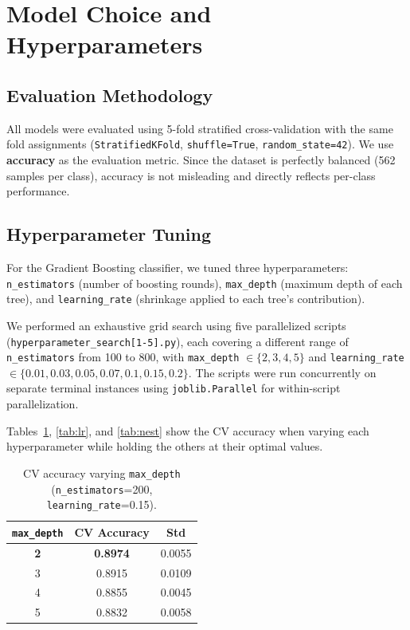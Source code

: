 \documentclass[12pt]{article}
\begin{document}
\section{Model Choice and Hyperparameters}

\subsection*{Evaluation Methodology}

All models were evaluated using 5-fold stratified cross-validation with the same fold assignments (\texttt{StratifiedKFold}, \texttt{shuffle=True}, \texttt{random\_state=42}). We use \textbf{accuracy} as the evaluation metric. Since the dataset is perfectly balanced (562 samples per class), accuracy is not misleading and directly reflects per-class performance.

\subsection*{Hyperparameter Tuning}

For the Gradient Boosting classifier, we tuned three hyperparameters: \texttt{n\_estimators} (number of boosting rounds), \texttt{max\_depth} (maximum depth of each tree), and \texttt{learning\_rate} (shrinkage applied to each tree's contribution).

We performed an exhaustive grid search using five parallelized scripts \\(\texttt{hyperparameter\_search[1-5].py}), each covering a different range of \texttt{n\_estimators} from 100 to 800, with \texttt{max\_depth} $\in \{2, 3, 4, 5\}$ and \texttt{learning\_rate} $\in \{0.01, 0.03, 0.05, 0.07, 0.1, 0.15, 0.2\}$. The scripts were run concurrently on separate terminal instances using \texttt{joblib.Parallel} for within-script parallelization.

Tables~\ref{tab:depth}, \ref{tab:lr}, and \ref{tab:nest} show the CV accuracy when varying each hyperparameter while holding the others at their optimal values.

\begin{table}[H]
\centering
\caption{CV accuracy varying \texttt{max\_depth} (\texttt{n\_estimators}=200, \texttt{learning\_rate}=0.15).}
\label{tab:depth}
\begin{tabular}{ccc}
\toprule
\texttt{max\_depth} & CV Accuracy & Std \\
\midrule
\textbf{2} & \textbf{0.8974} & 0.0055 \\
3 & 0.8915 & 0.0109 \\
4 & 0.8855 & 0.0045 \\
5 & 0.8832 & 0.0058 \\
\bottomrule
\end{tabular}
\end{table}
\end{document}
